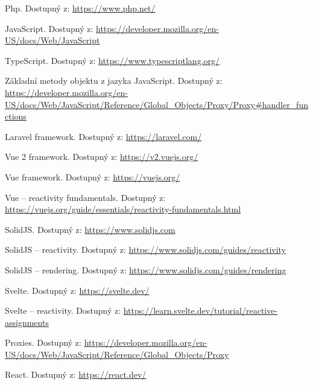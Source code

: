 \documentclass[
  master,
  program=ainf,
  tables=false,
  sourcecodes,
  glossaries,
  index
]{kidiplom}
\begin{document}
\begin{thebibliography}{9}
   Php. Dostupný z: \url{https://www.php.net/}

   JavaScript. Dostupný z: \url{https://developer.mozilla.org/en-US/docs/Web/JavaScript}

   TypeScript. Dostupný z: \url{https://www.typescriptlang.org/}
  
   Základní metody objektu z jazyka JavaScript. Dostupný z: \url{https://developer.mozilla.org/en-US/docs/Web/JavaScript/Reference/Global_Objects/Proxy/Proxy#handler_functions}

   Laravel framework. Dostupný z: \url{https://laravel.com/}

   Vue 2 framework. Dostupný z: \url{https://v2.vuejs.org/}

   Vue framework. Dostupný z: \url{https://vuejs.org/}

   Vue -- reactivity fundamentals. Dostupný z: \url{https://vuejs.org/guide/essentials/reactivity-fundamentals.html}
  
   SolidJS. Dostupný z: \url{https://www.solidjs.com}

   SolidJS -- reactivity. Dostupný z: \url{https://www.solidjs.com/guides/reactivity}
  
   SolidJS -- rendering. Dostupný z: \url{https://www.solidjs.com/guides/rendering}
  
   Svelte. Dostupný z: \url{https://svelte.dev/}

   Svelte -- reactivity. Dostupný z: \url{https://learn.svelte.dev/tutorial/reactive-assignments}
   
   Proxies. Dostupný z: \url{https://developer.mozilla.org/en-US/docs/Web/JavaScript/Reference/Global_Objects/Proxy}

   React. Dostupný z: \url{https://react.dev/}
\end{thebibliography}

\printindex
\end{document}
